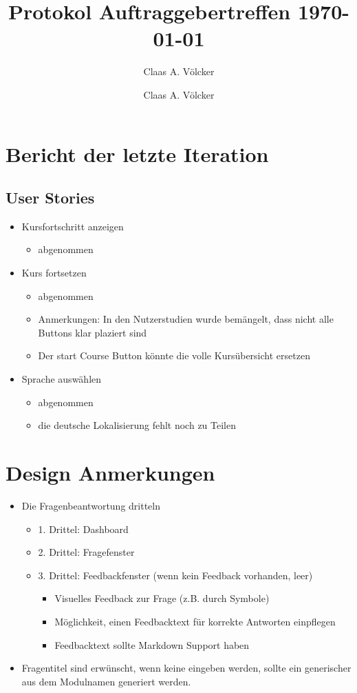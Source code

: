 \documentclass[colorback, accentcolor=tud1c, paper=a4]{tudexercise}
\title{Protokol Auftraggebertreffen \today}
\subtitle{Claas A. Völcker}
\author{Claas A. Völcker}
\begin{document}
	
\maketitle

\begin{multicols}{2}

\section{Bericht der letzte Iteration}

\subsection{User Stories}
\begin{itemize}
	\item Kursfortschritt anzeigen
	\begin{itemize}
		\item abgenommen
	\end{itemize}
	\item Kurs fortsetzen
	\begin{itemize}
		\item abgenommen
		\item Anmerkungen: In den Nutzerstudien wurde bemängelt, dass nicht alle Buttons klar plaziert sind
		\item Der start Course Button könnte die volle Kursübersicht ersetzen
	\end{itemize}
	\item Sprache auswählen
	\begin{itemize}
		\item abgenommen
		\item die deutsche Lokalisierung fehlt noch zu Teilen
	\end{itemize}
\end{itemize}

\section{Design Anmerkungen}
\begin{itemize}
	\item Die Fragenbeantwortung dritteln
	\begin{itemize}
		\item 1. Drittel: Dashboard
		\item 2. Drittel: Fragefenster
		\item 3. Drittel: Feedbackfenster (wenn kein Feedback vorhanden, leer)
		\begin{itemize}
			\item Visuelles Feedback zur Frage (z.B. durch Symbole)
			\item Möglichkeit, einen Feedbacktext für korrekte Antworten einpflegen
			\item Feedbacktext sollte Markdown Support haben
		\end{itemize}
	\end{itemize}
	\item Fragentitel sind erwünscht, wenn keine eingeben werden, sollte ein generischer aus dem Modulnamen generiert werden.
\end{itemize}



\end{multicols}
\end{document}
